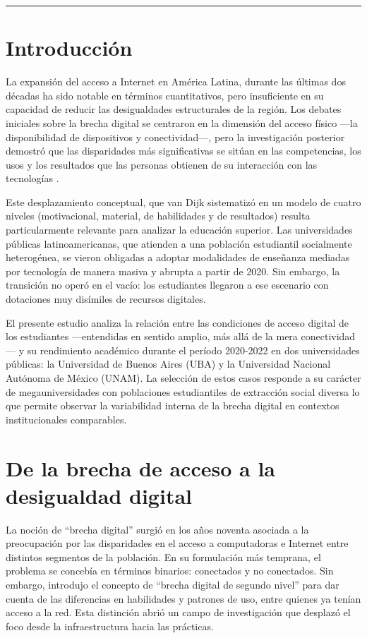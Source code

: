 \bigskip
\noindent\rule{\linewidth}{0.4pt}
\bigskip

\section{Introducción}
La expansión del acceso a Internet en América Latina, durante las últimas dos décadas ha sido notable en términos cuantitativos, pero insuficiente en su capacidad de reducir las desigualdades estructurales de la región. Los debates iniciales sobre la brecha digital se centraron en la dimensión del acceso físico —la disponibilidad de dispositivos y conectividad—, pero la investigación posterior demostró que las disparidades más significativas se sitúan en las competencias, los usos y los resultados que las personas obtienen de su interacción con las tecnologías \autocite{2565-HARGITTAI2002,2562-WARSCHAUER2004}.

Este desplazamiento conceptual, que van Dijk \autocite{2563-VANDIJK2020} sistematizó en un modelo de cuatro niveles (motivacional, material, de habilidades y de resultados) resulta particularmente relevante para analizar la educación superior. Las universidades públicas latinoamericanas, que atienden a una población estudiantil socialmente heterogénea, se vieron obligadas a adoptar modalidades de enseñanza mediadas por tecnología de manera masiva y abrupta a partir de 2020. Sin embargo, la transición no operó en el vacío: los estudiantes llegaron a ese escenario con dotaciones muy disímiles de recursos digitales.

El presente estudio analiza la relación entre las condiciones de acceso digital de los estudiantes —entendidas en sentido amplio, más allá de la mera conectividad— y su rendimiento académico durante el período 2020-2022 en dos universidades públicas: la Universidad de Buenos Aires (UBA) y la Universidad Nacional Autónoma de México (UNAM). La selección de estos casos responde a su carácter de megauniversidades con poblaciones estudiantiles de extracción social diversa lo que permite observar la variabilidad interna de la brecha digital en contextos institucionales comparables.


\section{De la brecha de acceso a la desigualdad digital}
La noción de “brecha digital” surgió en los años noventa asociada a la preocupación por las disparidades en el acceso a computadoras e Internet entre distintos segmentos de la población. En su formulación más temprana, el problema se concebía en términos binarios: conectados y no conectados. Sin embargo, \textcite{2565-HARGITTAI2002} introdujo el concepto de “brecha digital de segundo nivel” para dar cuenta de las diferencias en habilidades y patrones de uso, entre quienes ya tenían acceso a la red. Esta distinción abrió un campo de investigación que desplazó el foco desde la infraestructura hacia las prácticas.

